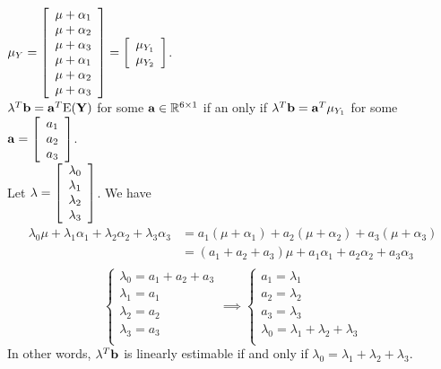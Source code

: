 \begin{pf}
	$\mathbf{\mu}_Y = \left[\begin{array}{c}
		\mu + \alpha_1 \\
		\mu + \alpha_2\\
		\mu + \alpha_3\\
		\mu + \alpha_1 \\
		\mu + \alpha_2\\
		\mu + \alpha_3\\
	\end{array}\right] = \left[\begin{array}{c}
	\mu_{Y_1}\\
	\mu_{Y_2}\\
\end{array}\right]$.\\
$\mathbf{\lambda}^T \mathbf{b} = \mathbf{a}^T \mbox{E}(\mathbf{Y})$ for some $\mathbf{a} \in \mathbb{R}^{6 \times 1}$ if an only if $\mathbf{\lambda}^T \mathbf{b} = \mathbf{a}^T \mathbf{\mu}_{Y_1}$ for some $\mathbf{a} = \left[\begin{array}{c}
	a_1\\
	a_2\\
	a_3\\
\end{array}\right]$.\\
Let $\mathbf{\lambda} = \left[\begin{array}{c}
	\lambda_0\\
	\lambda_1\\
	\lambda_2\\
	\lambda_3\\			
\end{array}\right]$.
We have
$$
\begin{aligned}
\lambda_0 \mu + \lambda_1 \alpha_1 + \lambda_2 \alpha_2 + \lambda_3 \alpha_3 &= a_1 (\mu + \alpha_1) + a_2 (\mu + \alpha_2) + a_3 (\mu + \alpha_3)\\
&= (a_1 + a_2 + a_3) \mu + a_1 \alpha_1 + a_2 \alpha_2 + a_3 \alpha_3\\
\end{aligned}
$$
$$
\left\{\begin{array}{l}
	\lambda_0 = a_1 + a_2 + a_3\\
	\lambda_1 = a_1\\
	\lambda_2 = a_2\\
	\lambda_3 = a_3\\
\end{array}\right. \implies \left\{ \begin{array}{l}
a_1 = \lambda_1\\
a_2 = \lambda_2\\
a_3 = \lambda_3\\
\lambda_0 = \lambda_1 + \lambda_2 + \lambda_3\\
\end{array}\right.
$$
In other words, $\mathbf{\lambda}^T \mathbf{b}$ is linearly estimable if and only if $\lambda_0 = \lambda_1 + \lambda_2 + \lambda_3$.
\end{pf}

